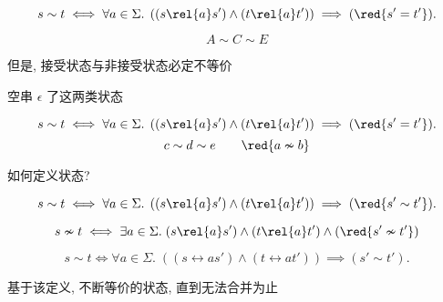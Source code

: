 \begin{frame}{}
  \[
    s \sim t \iff \forall a \in \Sigma.\;
      \left((s \rel{a} s') \land (t \rel{a} t')\right) \implies (\red{s' = t'}).
  \]


  \vspace{-0.30cm}
  \[
    A \sim C \sim E
  \]

  \pause
  \vspace{0.20cm}
  \begin{center}
    但是, 接受状态与非接受状态必定不等价

    \vspace{0.30cm}
    空串 $\epsilon$ 了这两类状态
  \end{center}
\end{frame}

\begin{frame}{}
  \[
    s \sim t \iff \forall a \in \Sigma.\;
      \left((s \rel{a} s') \land (t \rel{a} t')\right) \implies (\red{s' = t'}).
  \]
  \[
    c \sim d \sim e \qquad \red{a \nsim b}
  \]
\end{frame}

\begin{frame}{}
  \begin{center}
    如何定义状态?
  \end{center}


  \[
    s \sim t \iff \forall a \in \Sigma.\;
      \left((s \rel{a} s') \land (t \rel{a} t')\right) \implies (\red{s' \sim t'}).
  \]

  \pause
  \[
    s \nsim t \iff \exists a \in \Sigma.\;
      (s \rel{a} s') \land (t \rel{a} t') \land (\red{s' \nsim t'})
  \]
\end{frame}

\begin{frame}{}
  \begin{center}
    \[
      s \sim t \iff \forall a \in \Sigma.\;
        \left((s \rel{a} s') \land (t \rel{a} t')\right) \implies (s' \sim t').
    \]

    基于该定义, 不断等价的状态, 直到无法合并为止

    \pause
    \vspace{0.80cm}

    \pause
    \vspace{0.80cm}

    \pause
    \vspace{0.50cm}
  \end{center}
\end{frame}

